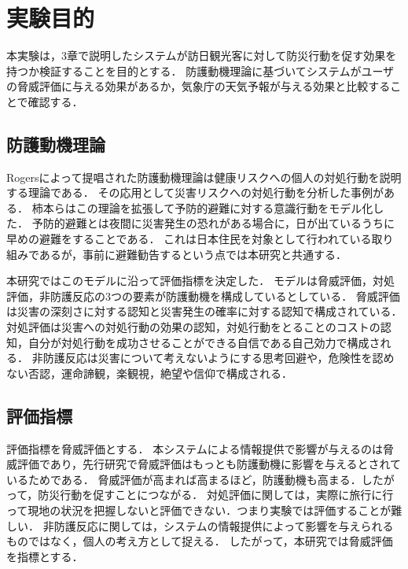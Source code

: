 \section{実験目的}
本実験は，3章で説明したシステムが訪日観光客に対して防災行動を促す効果を持つか検証することを目的とする．
防護動機理論に基づいてシステムがユーザの脅威評価に与える効果があるか，気象庁の天気予報が与える効果と比較することで確認する．

\subsection{防護動機理論}
Rogersによって提唱された防護動機理論\cite{1360292618739561728,1570572700020740224}は健康リスクへの個人の対処行動を説明する理論である．
その応用として災害リスクへの対処行動を分析した事例がある．
柿本ら\cite{Kakimoto2014}はこの理論を拡張して予防的避難に対する意識行動をモデル化した．
予防的避難とは夜間に災害発生の恐れがある場合に，日が出ているうちに早めの避難をすることである．
これは日本住民を対象として行われている取り組みであるが，事前に避難勧告するという点では本研究と共通する．\par
本研究ではこのモデルに沿って評価指標を決定した．
モデルは脅威評価，対処評価，非防護反応の3つの要素が防護動機を構成しているとしている．
脅威評価は災害の深刻さに対する認知と災害発生の確率に対する認知で構成されている．
対処評価は災害への対処行動の効果の認知，対処行動をとることのコストの認知，自分が対処行動を成功させることができる自信である自己効力で構成される．
非防護反応は災害について考えないようにする思考回避や，危険性を認めない否認，運命諦観，楽観視，絶望や信仰で構成される．

\subsection{評価指標}
評価指標を脅威評価とする．
本システムによる情報提供で影響が与えるのは脅威評価であり，先行研究で脅威評価はもっとも防護動機に影響を与えるとされているためである．
脅威評価が高まれば高まるほど，防護動機も高まる．したがって，防災行動を促すことにつながる．
対処評価に関しては，実際に旅行に行って現地の状況を把握しないと評価できない．つまり実験では評価することが難しい．
非防護反応に関しては，システムの情報提供によって影響を与えられるものではなく，個人の考え方として捉える．
したがって，本研究では脅威評価を指標とする．

